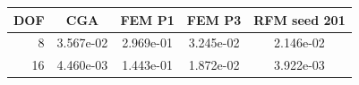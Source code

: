 \begin{tabular}{rcccc}
\toprule
DOF & CGA & FEM P1 & FEM P3 & RFM seed 201 \\
\midrule
8 & 3.567e-02 & 2.969e-01 & 3.245e-02 & 2.146e-02 \\
16 & 4.460e-03 & 1.443e-01 & 1.872e-02 & 3.922e-03 \\
\bottomrule
\end{tabular}
